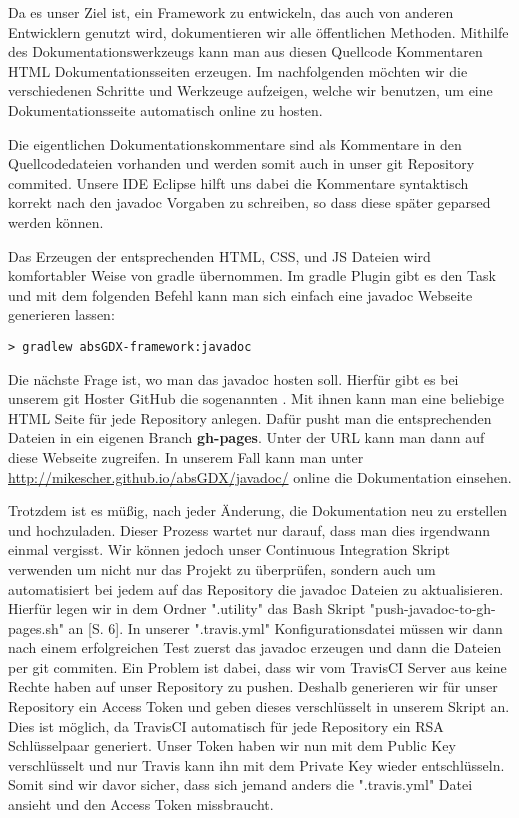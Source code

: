 
Da es unser Ziel ist, ein Framework zu entwickeln, das auch von anderen Entwicklern genutzt wird, dokumentieren wir alle öffentlichen Methoden. Mithilfe des Dokumentationswerkzeugs  kann man aus diesen Quellcode Kommentaren HTML Dokumentationsseiten erzeugen. Im nachfolgenden möchten wir die verschiedenen Schritte und Werkzeuge aufzeigen, welche wir benutzen, um eine Dokumentationsseite automatisch online zu hosten.

Die eigentlichen Dokumentationskommentare sind als Kommentare in den Quellcodedateien vorhanden und werden somit auch in unser git Repository commited. Unsere IDE Eclipse hilft uns dabei die Kommentare syntaktisch korrekt nach den javadoc Vorgaben zu schreiben, so dass diese später geparsed werden können.

Das Erzeugen der entsprechenden HTML, CSS, und JS Dateien wird komfortabler Weise von gradle übernommen. Im gradle Plugin  gibt es den Task  und mit dem folgenden Befehl kann man sich einfach eine javadoc Webseite generieren lassen: 

\doinlineII
\begin{lstlisting}[caption=Gradle in der Kommandozeile, title=\hspace{0 pt}, style=cmd]
> gradlew absGDX-framework:javadoc
\end{lstlisting}

Die nächste Frage ist, wo man das javadoc hosten soll. Hierfür gibt es bei unserem git Hoster GitHub die sogenannten . Mit ihnen kann man eine beliebige HTML Seite für jede Repository anlegen. Dafür pusht man die entsprechenden Dateien in ein eigenen Branch \textbf{gh-pages}. Unter der URL  kann man dann auf diese Webseite zugreifen. In unserem Fall kann man unter \href{http://mikescher.github.io/absGDX/javadoc/}{http://mikescher.github.io/absGDX/javadoc/} online die Dokumentation einsehen.

Trotzdem ist es müßig, nach jeder Änderung, die Dokumentation neu zu erstellen und hochzuladen. Dieser Prozess wartet nur darauf, dass man dies irgendwann einmal vergisst.
Wir können jedoch unser Continuous Integration Skript verwenden um nicht nur das Projekt zu überprüfen, sondern auch um automatisiert bei jedem  auf das Repository die javadoc Dateien zu aktualisieren.
Hierfür legen wir in dem Ordner ".utility" das Bash Skript "push-javadoc-to-gh-pages.sh" an \cite{BASH}[S. 6]. In unserer ".travis.yml" Konfigurationsdatei müssen wir dann nach einem erfolgreichen Test zuerst das javadoc erzeugen und dann die Dateien per git commiten. Ein Problem ist dabei, dass wir vom TravisCI Server aus keine Rechte haben auf unser Repository zu pushen. Deshalb generieren wir für unser Repository ein Access Token und geben dieses verschlüsselt in unserem Skript an. Dies ist möglich, da TravisCI automatisch für jede Repository ein RSA Schlüsselpaar generiert. Unser Token haben wir nun mit dem Public Key verschlüsselt und nur Travis kann ihn mit dem Private Key wieder entschlüsseln. Somit sind wir davor sicher, dass sich jemand anders die  ".travis.yml" Datei ansieht und den Access Token missbraucht.

